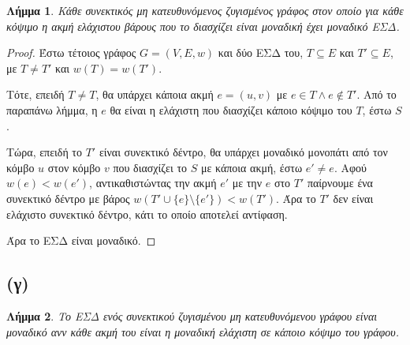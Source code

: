 \documentclass[11pt,a4paper,oneside]{report}
\newtheorem*{lemma}{Λήμμα}
\begin{document}
\begin{lemma}
Κάθε συνεκτικός μη κατευθυνόμενος ζυγισμένος γράφος στον οποίο για κάθε κόψιμο η ακμή ελάχιστου βάρους που το διασχίζει είναι μοναδική έχει μοναδικό ΕΣΔ.
\end{lemma}
\begin{proof}
Έστω τέτοιος γράφος $G = (V, E, w)$ και δύο ΕΣΔ του, $T \subseteq E$ και $T' \subseteq E$,
με $T \neq T'$ και $w(T) = w(T')$.

Τότε, επειδή $T \neq T$, θα υπάρχει κάποια ακμή $e = (u, v)$ με $e \in T \land e \not\in T'$. Από το παραπάνω λήμμα, η $e$ θα είναι η ελάχιστη που διασχίζει κάποιο κόψιμο του $T$, έστω $S$.

Τώρα, επειδή το $T'$ είναι συνεκτικό δέντρο, θα υπάρχει μοναδικό μονοπάτι από τον κόμβο $u$ στον κόμβο $v$ που διασχίζει το $S$ με κάποια ακμή, έστω $e' \neq e$. Αφού $w(e) < w(e')$, αντικαθιστώντας την ακμή $e'$ με την $e$ στο $T'$ παίρνουμε ένα συνεκτικό δέντρο με βάρος $w(T' \cup\{e\} \setminus \{e'\}) < w(T')$. Άρα το $T'$ δεν είναι ελάχιστο συνεκτικό δέντρο, κάτι το οποίο αποτελεί αντίφαση.

Άρα το ΕΣΔ είναι μοναδικό.
\end{proof}

\subsection*{(γ)}
\begin{lemma}
Το ΕΣΔ ενός συνεκτικού ζυγισμένου μη κατευθυνόμενου γράφου είναι μοναδικό ανν κάθε ακμή του είναι η μοναδική ελάχιστη σε κάποιο κόψιμο του γράφου.
\end{lemma}
\end{document}
